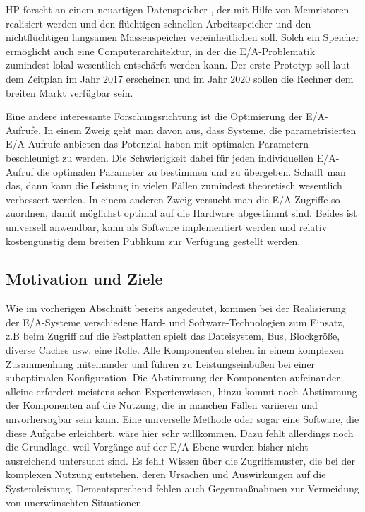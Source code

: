 HP forscht an einem neuartigen Datenspeicher \cite{hp_memristor_future}, der mit Hilfe von Memristoren realisiert werden und den flüchtigen schnellen Arbeitsspeicher und den nichtflüchtigen langsamen Massenspeicher vereinheitlichen soll. Solch ein Speicher ermöglicht auch eine Computerarchitektur, in der die E/A-Problematik zumindest lokal wesentlich entschärft werden kann. Der erste Prototyp soll laut dem Zeitplan im Jahr 2017 erscheinen und im Jahr 2020 sollen die Rechner dem breiten Markt verfügbar sein. 

Eine andere interessante Forschungsrichtung ist die Optimierung der E/A-Aufrufe. In einem Zweig geht man davon aus, dass Systeme, die parametrisierten E/A-Aufrufe anbieten das Potenzial haben mit optimalen Parametern beschleunigt zu werden. Die Schwierigkeit dabei für jeden individuellen E/A-Aufruf die optimalen Parameter zu bestimmen und zu übergeben. Schafft man das, dann kann die Leistung in vielen Fällen zumindest theoretisch wesentlich verbessert werden. In einem anderen Zweig versucht man die E/A-Zugriffe so zuordnen, damit möglichst optimal auf die Hardware abgestimmt sind. Beides ist universell anwendbar, kann als Software implementiert werden und relativ kostengünstig dem breiten Publikum zur Verfügung gestellt werden.

\subsection{Motivation und Ziele}
Wie im vorherigen Abschnitt bereits angedeutet, kommen bei der Realisierung der E/A-Systeme verschiedene Hard- und Software-Technologien zum Einsatz, z.B beim Zugriff auf die Festplatten spielt das Dateisystem, Bus, Blockgröße, diverse Caches usw. eine Rolle. Alle Komponenten stehen in einem komplexen Zusammenhang miteinander und führen zu Leistungseinbußen bei einer suboptimalen Konfiguration. Die Abstimmung der Komponenten aufeinander alleine erfordert meistens schon Expertenwissen, hinzu kommt noch Abstimmung der Komponenten auf die Nutzung, die in manchen Fällen variieren und unvorhersagbar sein kann. Eine universelle Methode oder sogar eine Software, die diese Aufgabe erleichtert, wäre hier sehr willkommen. Dazu fehlt allerdings noch die Grundlage, weil Vorgänge auf der E/A-Ebene wurden bisher nicht ausreichend untersucht sind. Es fehlt Wissen über die Zugriffsmuster, die bei der komplexen Nutzung entstehen, deren Ursachen und Auswirkungen auf die Systemleistung. Dementsprechend fehlen auch Gegenmaßnahmen zur Vermeidung von unerwünschten Situationen.

